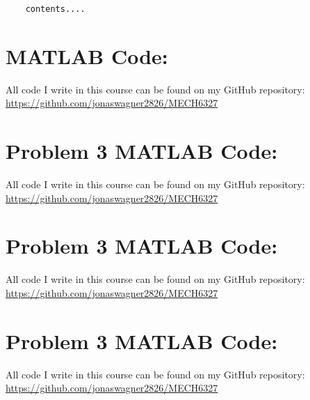 \documentclass[letter]{article}
\begin{document}
\begin{Verbatim}
	contents....
\end{Verbatim}















\newpage
\appendix
\section{MATLAB Code:}\label{apx:matlab}
All code I write in this course can be found on my GitHub repository:\\
\href{https://github.com/jonaswagner2826/MECH6337}{https://github.com/jonaswagner2826/MECH6327}


\newpage
\section{Problem 3 MATLAB Code:}\label{apx:pblm1_matlab}
All code I write in this course can be found on my GitHub repository:\\
\href{https://github.com/jonaswagner2826/MECH6327}{https://github.com/jonaswagner2826/MECH6327}


\newpage
\section{Problem 3 MATLAB Code:}\label{apx:pblm2_matlab}
All code I write in this course can be found on my GitHub repository:\\
\href{https://github.com/jonaswagner2826/MECH6327}{https://github.com/jonaswagner2826/MECH6327}


\newpage
\section{Problem 3 MATLAB Code:}\label{apx:pblm3_matlab}
All code I write in this course can be found on my GitHub repository:\\
\href{https://github.com/jonaswagner2826/MECH6327}{https://github.com/jonaswagner2826/MECH6327}













\newpage


\end{document}

